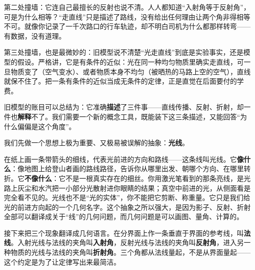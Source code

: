 第二处撞墙：它连自己最擅长的反射也说不清。人人都知道“入射角等于反射角”，可是为什么相等？“走直线”只是描述了路线，没有给出任何理由让两个角非得相等不可。就像你记录了一千次路口的行车轨迹，却不明白司机为什么都那样转弯——有数据，没有道理。

第三处撞墙，也是最微妙的：旧模型说不清楚“光走直线”到底是实验事实，还是模型的假设。严格讲，它是有条件的近似：光在同一种均匀物质里确实走直线，可一旦物质变了（空气变水）、或者物质本身不均匀（被晒热的马路上空的空气），直线就保不住了。把一条有条件的近似当成无条件的定律，正是直觉在后面要付的学费。

\begin{mainline}
旧模型的账目可以总结为：它准确\textbf{描述}了三件事——直线传播、反射、折射，却一件也\textbf{解释}不了。我们需要一个新的概念工具，既能装下这三条描述，又能回答“为什么偏偏是这个角度”。
\end{mainline}


我们先做一个思想上极为重要、又极易被误解的抽象：\textbf{光线}。

在纸上画一条带箭头的细线，代表光前进的方向和路线——这条线叫光线。它\textbf{像什么}：像地图上给登山者画的路线路径，告诉你从哪里出发、朝哪个方向、在哪里转折。它\textbf{不像什么}：它不是一根真实存在的细丝。你用激光笔看到的那条亮线，是光路上灰尘和水汽把一小部分光散射进你眼睛的结果；真空中前进的光，从侧面看是完全看不见的。光线也不是“光的实体”，你不能把它剪断、称重量。它只是我们给光的前进方向起的一个几何名字。这个抽象之所以强大，是因为影子、反射、折射全部可以翻译成关于“线”的几何问题，而几何问题是可以画图、量角、计算的。

接下来把三个现象翻译成几何语言。在分界面上作一条垂直于界面的参考线，叫\textbf{法线}。入射光线与法线的夹角叫\textbf{入射角}，反射光线与法线的夹角叫\textbf{反射角}，进入另一种物质的光线与法线的夹角叫\textbf{折射角}。三个角都从法线量起，不是从界面量起——这个约定是为了让定律写出来最简洁。

\begin{center}
\end{center}


